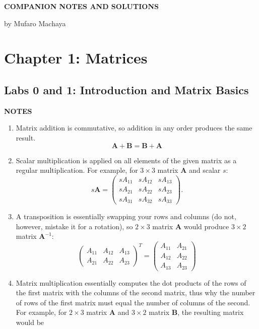 \documentclass[12pt]{article}
\newcommand{\mat}[1]{\mathbf{#1}}
\newcommand{\notes}{\textbf{NOTES}}
\begin{document}
\textbf{\Large COMPANION NOTES AND SOLUTIONS}

by Mufaro Machaya

\tableofcontents
\newpage

\section{Chapter 1: Matrices}

\subsection{Labs 0 and 1: Introduction and Matrix Basics}

\notes

\begin{enumerate}
\item Matrix addition is commutative, so addition in any order produces the same result.
\begin{equation}
  \mat{A} + \mat{B} = \mat{B} + \mat{A}
\end{equation}
\item Scalar multiplication is applied on all elements of the given matrix as a regular multiplication. For example, for $3 \times 3$ matrix $\mat{A}$ and scalar $s$:
\begin{equation}
    s\mat{A} =
\begin{pmatrix} 
  sA_{11} & sA_{12} & sA_{13} \\
  sA_{21} & sA_{22} & sA_{23} \\
  sA_{31} & sA_{32} & sA_{33}
\end{pmatrix}.
\end{equation}
\item A transposition is essentially swapping your rows and columns (do not, however, mistake it for a rotation), so $2 \times 3$ matrix $\mat{A}$ would produce $3 \times 2$ matrix $\mat{A}^{-1}$:
\begin{equation}
  \begin{pmatrix}
    A_{11} & A_{12} & A_{13} \\
    A_{21} & A_{22} & A_{23}
  \end{pmatrix}^{T} =
  \begin{pmatrix}
    A_{11} & A_{21} \\
    A_{12} & A_{22} \\
    A_{13} & A_{23}
  \end{pmatrix}
\end{equation}
\item Matrix multiplication essentially computes the dot products of the rows of the first matrix with the columns of the second matrix, thus why the number of rows of the first matrix must equal the number of columns of the second. For example, for $2 \times 3$ matrix $\mat{A}$ and $3 \times 2$ matrix $\mat{B}$, the resulting matrix would be

\end{enumerate}
\end{document}
